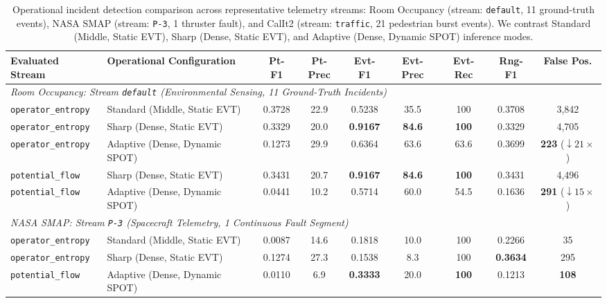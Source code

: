 \begin{table}[t]
\centering
\small
\caption{Operational incident detection comparison across representative telemetry streams: Room Occupancy (stream: \texttt{default}, 11 ground-truth events), NASA SMAP (stream: \texttt{P-3}, 1 thruster fault), and CalIt2 (stream: \texttt{traffic}, 21 pedestrian burst events). We contrast Standard (Middle, Static EVT), Sharp (Dense, Static EVT), and Adaptive (Dense, Dynamic SPOT) inference modes.}
\label{tab:operational_incident_metrics}
\scriptsize
\setlength{\tabcolsep}{2.5pt}
\begin{tabular}{@{}llccccccc@{}}
\toprule
\textbf{Evaluated Stream} & \textbf{Operational Configuration} & \textbf{Pt-F1} & \textbf{Pt-Prec} & \textbf{Evt-F1} & \textbf{Evt-Prec} & \textbf{Evt-Rec} & \textbf{Rng-F1} & \textbf{False Pos.} \\
\midrule
\multicolumn{9}{l}{\textit{Room Occupancy: Stream \texttt{default} (Environmental Sensing, 11 Ground-Truth Incidents)}} \\
\texttt{operator\_entropy} & Standard (Middle, Static EVT) & 0.3728 & 22.9 & 0.5238 & 35.5 & 100 & 0.3708 & 3,842 \\
\texttt{operator\_entropy} & Sharp (Dense, Static EVT)   & 0.3329 & 20.0 & \textbf{0.9167} & \textbf{84.6} & \textbf{100} & 0.3329 & 4,705 \\
\texttt{operator\_entropy} & Adaptive (Dense, Dynamic SPOT) & 0.1273 & 29.9 & 0.6364 & 63.6 & 63.6 & 0.3699 & \textbf{223} ($\downarrow 21\times$) \\
\texttt{potential\_flow}   & Sharp (Dense, Static EVT)   & 0.3431 & 20.7 & \textbf{0.9167} & \textbf{84.6} & \textbf{100} & 0.3431 & 4,496 \\
\texttt{potential\_flow}   & Adaptive (Dense, Dynamic SPOT) & 0.0441 & 10.2 & 0.5714 & 60.0 & 54.5 & 0.1636 & \textbf{291} ($\downarrow 15\times$) \\
\midrule
\multicolumn{9}{l}{\textit{NASA SMAP: Stream \texttt{P-3} (Spacecraft Telemetry, 1 Continuous Fault Segment)}} \\
\texttt{operator\_entropy} & Standard (Middle, Static EVT) & 0.0087 & 14.6 & 0.1818 & 10.0 & 100 & 0.2266 & 35 \\
\texttt{operator\_entropy} & Sharp (Dense, Static EVT)   & 0.1274 & 27.3 & 0.1538 & 8.3  & 100 & \textbf{0.3634} & 295 \\
\texttt{potential\_flow}   & Adaptive (Dense, Dynamic SPOT) & 0.0110 & 6.9  & \textbf{0.3333} & 20.0 & \textbf{100} & 0.1213 & \textbf{108} \\

\end{tabular}
\end{table}
